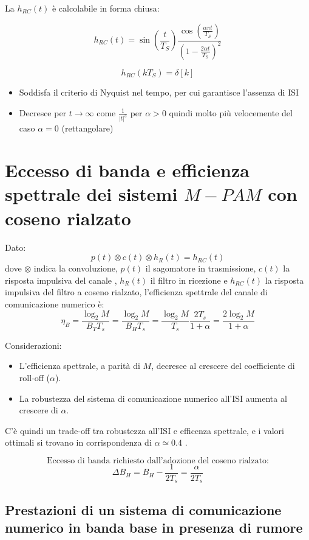 \documentclass{article}
\begin{document}
La \( h_{RC}(t) \) \`e calcolabile in forma chiusa:

\[ h_{RC}(t) = \sin\left(\frac{t}{T_S}\right) \frac{\cos\left(\frac{\alpha \pi t}{T_S}\right)}{\left(1- \frac{2\alpha t}{T_S}\right)^2}  \]

\[ h_{RC}(kT_S) = \delta[k] \]

\begin{itemize}
\item Soddisfa il criterio di Nyquist nel tempo, per cui garantisce l'assenza di ISI
\item Decresce per \( t \rightarrow \infty \) come \( \frac{1}{|t|^3} \) per \( \alpha > 0 \) quindi molto pi\`u velocemente del caso \( \alpha = 0 \) (rettangolare)
\end{itemize}




\section*{Eccesso di banda e efficienza spettrale dei sistemi \( M-PAM \) con coseno rialzato}

Dato:
\[ p(t) \otimes c(t) \otimes h_R(t) = h_{RC}(t) \]
dove \( \otimes \) indica la convoluzione, $p(t)$ il sagomatore in trasmissione, $c(t)$ la risposta impulsiva del canale , $h_R(t)$ il filtro in ricezione e \( h_{RC}(t) \) la risposta impulsiva del filtro a coseno rialzato, l'efficienza spettrale del canale di comunicazione numerico è:
\[ \eta_{B} = \frac{\log_2M}{B_T T_s} = \frac{\log_2M}{B_H T_s} = \frac{\log_2M}{ T_s} \frac{2T_s}{1+\alpha} = \frac{2\log_2M}{1+\alpha}\]

Considerazioni:
\begin{itemize}
    \item L'efficienza spettrale, a parità di \( M \), decresce al crescere del coefficiente di roll-off (\( \alpha \)).
    \item La robustezza del sistema di comunicazione numerico all'ISI aumenta al crescere di \( \alpha \).
\end{itemize}

C'è quindi un trade-off tra robustezza all'ISI e efficenza spettrale, e i valori ottimali si trovano in corrispondenza di \( \alpha \simeq 0.4 \) .

\[ \text{Eccesso di banda richiesto dall'adozione del coseno rialzato:} \]
\[ \Delta B_{H} = B_{H} - \frac{1}{2T_s} = \frac{\alpha}{2T_s} \]



\subsection*{Prestazioni di un sistema di comunicazione numerico in banda base in presenza di rumore}
\end{document}
